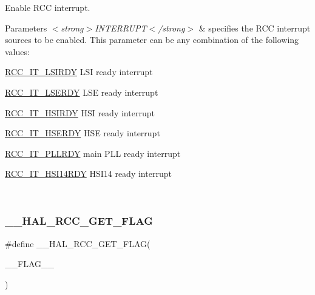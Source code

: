 Enable R\+CC interrupt. 


\begin{DoxyParams}{Parameters}
{\em $<$strong$>$\+I\+N\+T\+E\+R\+R\+U\+P\+T$<$/strong$>$} & specifies the R\+CC interrupt sources to be enabled. This parameter can be any combination of the following values\+: \begin{DoxyItemize}
\item \hyperlink{group___r_c_c___interrupt_ga2b4ef277c1b71f96e0bef4b9a72fca94}{R\+C\+C\+\_\+\+I\+T\+\_\+\+L\+S\+I\+R\+DY} L\+SI ready interrupt \item \hyperlink{group___r_c_c___interrupt_gad6b6e78a426850f595ef180d292a673d}{R\+C\+C\+\_\+\+I\+T\+\_\+\+L\+S\+E\+R\+DY} L\+SE ready interrupt \item \hyperlink{group___r_c_c___interrupt_ga69637e51b71f73f519c8c0a0613d042f}{R\+C\+C\+\_\+\+I\+T\+\_\+\+H\+S\+I\+R\+DY} H\+SI ready interrupt \item \hyperlink{group___r_c_c___interrupt_gad13eaede352bca59611e6cae68665866}{R\+C\+C\+\_\+\+I\+T\+\_\+\+H\+S\+E\+R\+DY} H\+SE ready interrupt \item \hyperlink{group___r_c_c___interrupt_ga68d48e7811fb58f2649dce6cf0d823d9}{R\+C\+C\+\_\+\+I\+T\+\_\+\+P\+L\+L\+R\+DY} main P\+LL ready interrupt \item \hyperlink{group___r_c_c___interrupt_ga3b85dd0ddf5c816fad2bb2c149129c01}{R\+C\+C\+\_\+\+I\+T\+\_\+\+H\+S\+I14\+R\+DY} H\+S\+I14 ready interrupt \end{DoxyItemize}
\\
\hline
\end{DoxyParams}
\mbox{\label{group___r_c_c___flags___interrupts___management_gae2d7d461630562bf2a2ddb31b1f96449}} 
\subsubsection{\texorpdfstring{\+\_\+\+\_\+\+H\+A\+L\+\_\+\+R\+C\+C\+\_\+\+G\+E\+T\+\_\+\+F\+L\+AG}{\_\_HAL\_RCC\_GET\_FLAG}}
{\footnotesize\ttfamily \#define \+\_\+\+\_\+\+H\+A\+L\+\_\+\+R\+C\+C\+\_\+\+G\+E\+T\+\_\+\+F\+L\+AG(\begin{DoxyParamCaption}\item[{}]{\+\_\+\+\_\+\+F\+L\+A\+G\+\_\+\+\_\+ }\end{DoxyParamCaption})}

